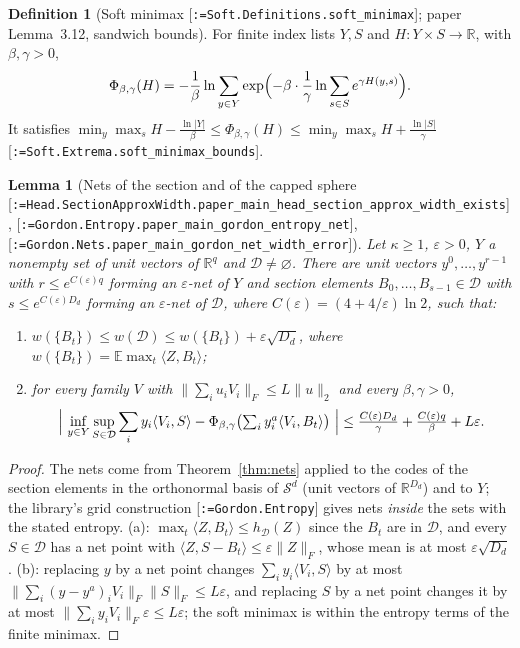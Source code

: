 \documentclass[11pt]{article}
\makeatletter
\newcommand{\formal@break}[1]{\@tfor\formal@tok:=#1\do{%
  \formal@tok
  \expandafter\ifx\formal@tok.\allowbreak\else
  \expandafter\ifx\formal@tok\_\allowbreak\fi\fi}}
\DeclareRobustCommand{\formal}[1]{\textnormal{[\texttt{\small\formal@break{#1}}]}}
\newcommand{\R}{\mathbb{R}}
\newcommand{\E}{\mathbb{E}}
\newcommand{\Sym}{\mathcal{S}}
\newcommand{\ip}[2]{\langle #1, #2\rangle}
\newcommand{\norm}[1]{\lVert #1\rVert}
\newcommand{\abs}[1]{\lvert #1\rvert}
\newcommand{\Fro}{F}
\newcommand{\Dd}{D}
\theoremstyle{plain}
\newtheorem{lemma}[theorem]{Lemma}
\theoremstyle{definition}
\newtheorem{definition}[theorem]{Definition}
\makeatother
\begin{document}
\begin{definition}[Soft minimax \formal{Soft.Definitions.soft\_minimax}; paper Lemma~3.12, sandwich bounds]\label{def:softmm}
For finite index lists $Y, S$ and $H : Y \times S \to \R$, with $\beta, \gamma > 0$,
\[
\Phi_{\beta,\gamma}(H) = -\frac1\beta\ln\sum_{y\in Y}\exp\Bigl(-\beta\cdot\frac1\gamma\ln\sum_{s\in S}e^{\gamma H(y,s)}\Bigr).
\]
It satisfies $\min_y\max_sH - \frac{\ln\abs{Y}}{\beta} \le \Phi_{\beta,\gamma}(H) \le \min_y\max_sH + \frac{\ln\abs{S}}{\gamma}$
\formal{Soft.Extrema.soft\_minimax\_bounds}.
\end{definition}

\begin{lemma}[Nets of the section and of the capped sphere \formal{Head.SectionApproxWidth.paper\_main\_head\_section\_approx\_width\_exists}, \formal{Gordon.Entropy.paper\_main\_gordon\_entropy\_net}, \formal{Gordon.Nets.paper\_main\_gordon\_net\_width\_error}]\label{lem:section_nets}
Let $\kappa \ge 1$, $\varepsilon > 0$, $Y$ a nonempty set of unit vectors of
$\R^q$ and $\mathcal{D} \ne \varnothing$. There are unit vectors $y^0, \dots, y^{r-1}$
with $r \le e^{C(\varepsilon)q}$ forming an $\varepsilon$-net of $Y$ and
section elements $B_0, \dots, B_{s-1} \in \mathcal{D}$ with $s \le e^{C(\varepsilon)\Dd_d}$
forming an $\varepsilon$-net of $\mathcal{D}$, where $C(\varepsilon) = (4 + 4/\varepsilon)\ln 2$,
such that:
\begin{enumerate}
\item[(a)] $w(\{B_t\}) \le w(\mathcal{D}) \le w(\{B_t\}) + \varepsilon\sqrt{\Dd_d}$, where
$w(\{B_t\}) = \E\max_t\ip{Z}{B_t}$;
\item[(b)] for every family $V$ with $\norm{\sum_iu_iV_i}_\Fro \le L\norm{u}_2$ and every $\beta, \gamma > 0$,
\[
\Bigl|\ \inf_{y\in Y}\sup_{S\in\mathcal{D}}\sum_iy_i\ip{V_i}{S} - \Phi_{\beta,\gamma}\bigl(\textstyle\sum_iy^a_i\ip{V_i}{B_t}\bigr)\ \Bigr|
\le \frac{C(\varepsilon)\Dd_d}{\gamma} + \frac{C(\varepsilon)q}{\beta} + L\varepsilon .
\]
\end{enumerate}
\end{lemma}

\begin{proof}
The nets come from Theorem~\ref{thm:nets} applied to the codes of the
section elements in the orthonormal basis of $\Sym^d$ (unit vectors of
$\R^{\Dd_d}$) and to $Y$; the library's grid construction
\formal{Gordon.Entropy} gives nets \emph{inside} the sets with the stated
entropy. (a): $\max_t\ip{Z}{B_t} \le h_{\mathcal{D}}(Z)$ since the $B_t$ are
in $\mathcal{D}$, and every $S \in \mathcal{D}$ has a net point with
$\ip{Z}{S - B_t} \le \varepsilon\norm{Z}_\Fro$, whose mean is at most
$\varepsilon\sqrt{\Dd_d}$. (b): replacing $y$ by a net point changes
$\sum_iy_i\ip{V_i}{S}$ by at most $\norm{\sum_i(y - y^a)_iV_i}_\Fro\norm{S}_\Fro \le L\varepsilon$,
and replacing $S$ by a net point changes it by at most
$\norm{\sum_iy_iV_i}_\Fro\varepsilon \le L\varepsilon$; the soft minimax is
within the entropy terms of the finite minimax.
\end{proof}
\end{document}

